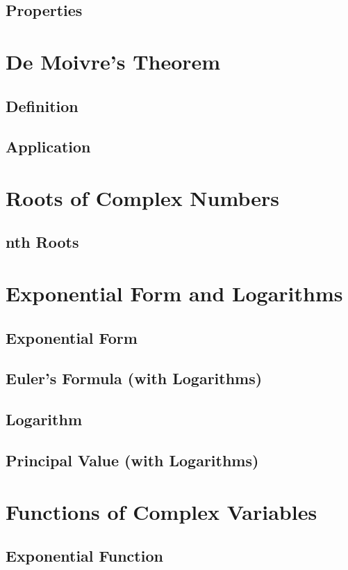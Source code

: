 \documentclass[12pt]{article}
\begin{document}
    \subsection{Properties}

    \section{De Moivre's Theorem}
    \subsection{Definition}
    \subsection{Application}

    \section{Roots of Complex Numbers}
    \subsection{nth Roots}
    
    \section{Exponential Form and Logarithms}
    \subsection{Exponential Form}
    \subsection{Euler's Formula (with Logarithms)}
    \subsection{Logarithm}
    \subsection{Principal Value (with Logarithms)}

    \section{Functions of Complex Variables}
    \subsection{Exponential Function}
\end{document}
